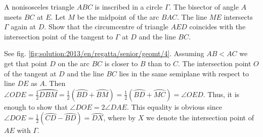 \problem
A nonisosceles triangle $ABC$ is inscribed in a circle $\Gamma$.
The bisector of angle $A$ meets $BC$ at $E$.
Let $M$ be the midpoint of the arc $BAC$.
The line $ME$ intersects $\Gamma$ again at $D$.
Show that the circumcentre of triangle $AED$ coincides with the intersection
point of the tangent to $\Gamma$ at $D$ and the line $BC$.

%
\label{solution:2013/en/regatta/senior/geomt/4}%
See fig. \ref{fig:solution:2013/en/regatta/senior/geomt/4}.
Assuming $AB < AC$ we get that point $D$ on the arc $BC$ is closer to $B$ than
to $C$.
The intersection point $O$ of the tangent at $D$ and the line $BC$ lies in the
same semiplane with respect to line $DE$ as $A$.
Then
\(
    \angle ODE = \frac{1}{2} \wideparen{DBM}
=
    \frac{1}{2} (\wideparen{BD} + \wideparen{BM})
=
    \frac{1}{2} (\wideparen{BD} + \wideparen{MC})
=
    \angle OED
\).
Thus, it is enough to show that $\angle DOE = 2\angle DAE$.
This equality is obvious since
$\angle DOE = \frac{1}{2} (\wideparen{CD} - \wideparen{BD}) = \wideparen{DX}$,
where by $X$ we denote the intersection point of $AE$ with $\Gamma$.
\endproblem
